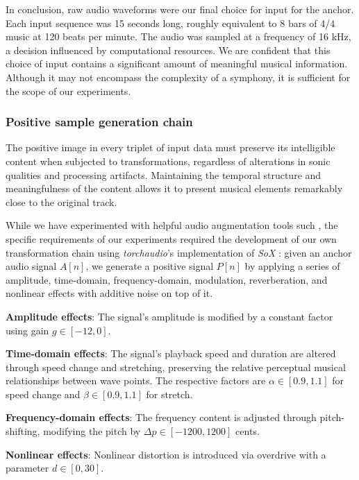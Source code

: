 In conclusion, raw audio waveforms were our final choice for input for the anchor. Each input sequence was 15 seconds long, roughly equivalent to 8 bars of 4/4 music at 120 beats per minute. The audio was sampled at a frequency of 16 kHz, a decision influenced by computational resources. We are confident that this choice of input contains a significant amount of meaningful musical information. Although it may not encompass the complexity of a symphony, it is sufficient for the scope of our experiments.

\subsubsection{Positive sample generation chain}

The positive image in every triplet of input data must preserve its intelligible content when subjected to transformations, regardless of alterations in sonic qualities and processing artifacts. Maintaining the temporal structure and meaningfulness of the content allows it to present musical elements remarkably close to the original track.

While we have experimented with helpful audio augmentation tools such \cite{Spijkervet2021Spijkervet/torchaudio-augmentations:V1.0, Kharitonov2020DataDomain}, the specific requirements of our experiments required the development of our own transformation chain using \textit{torchaudio}'s \cite{Yang2021TorchAudio:Processing} implementation of \textit{SoX} \cite{sox}: given an anchor audio signal $A[n]$, we generate a positive signal $P[n]$ by applying a series of amplitude, time-domain, frequency-domain, modulation, reverberation, and nonlinear effects with additive noise on top of it. 

\textbf{Amplitude effects}: The signal's amplitude is modified by a constant factor using gain $g \in [-12, 0]$. 

\textbf{Time-domain effects}: The signal's playback speed and duration are altered through speed change and stretching, preserving the relative perceptual musical relationships between wave points. The respective factors are $\alpha \in [0.9, 1.1]$ for speed change and $\beta \in [0.9, 1.1]$ for stretch. 

\textbf{Frequency-domain effects}: The frequency content is adjusted through pitch-shifting, modifying the pitch by $\Delta p \in [-1200, 1200]$ cents. 

\textbf{Nonlinear effects}: Nonlinear distortion is introduced via overdrive with a parameter $d \in [0, 30]$. 


